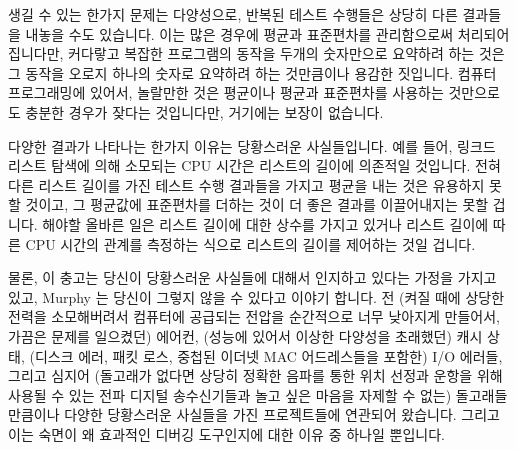 생길 수 있는 한가지 문제는 다양성으로, 반복된 테스트 수행들은 상당히 다른
결과들을 내놓을 수도 있습니다.
이는 많은 경우에 평균과 표준편차를 관리함으로써 처리되어집니다만, 커다랗고
복잡한 프로그램의 동작을 두개의 숫자만으로 요약하려 하는 것은 그 동작을 오로지
하나의 숫자로 요약하려 하는 것만큼이나 용감한 짓입니다.
컴퓨터 프로그래밍에 있어서, 놀랄만한 것은 평균이나 평균과 표준편차를 사용하는
것만으로도 충분한 경우가 잦다는 것입니다만, 거기에는 보장이 없습니다.

다양한 결과가 나타나는 한가지 이유는 당황스러운 사실들입니다.
예를 들어, 링크드 리스트 탐색에 의해 소모되는 CPU 시간은 리스트의 길이에
의존적일 것입니다.
전혀 다른 리스트 길이를 가진 테스트 수행 결과들을 가지고 평균을 내는 것은
유용하지 못할 것이고, 그 평균값에 표준편차를 더하는 것이 더 좋은 결과를
이끌어내지는 못할 겁니다.
해야할 올바른 일은 리스트 길이에 대한 상수를 가지고 있거나 리스트 길이에 따른
CPU 시간의 관계를 측정하는 식으로 리스트의 길이를 제어하는 것일 겁니다.

물론, 이 충고는 당신이 당황스러운 사실들에 대해서 인지하고 있다는 가정을 가지고
있고, Murphy 는 당신이 그렇지 않을 수 있다고 이야기 합니다.
전 (켜질 때에 상당한 전력을 소모해버려서 컴퓨터에 공급되는 전압을 순간적으로
너무 낮아지게 만들어서, 가끔은 문제를 일으켰던) 에어컨, (성능에 있어서 이상한
다양성을 초래했던) 캐시 상태, (디스크 에러, 패킷 로스, 중첩된 이더넷 MAC
어드레스들을 포함한) I/O 에러들, 그리고 심지어 (돌고래가 없다면 상당히 정확한
음파를 통한 위치 선정과 운항을 위해 사용될 수 있는 전파 디지털 송수신기들과
놀고 싶은 마음을 자제할 수 없는) 돌고래들만큼이나 다양한 당황스러운 사실들을
가진 프로젝트들에 연관되어 왔습니다.
그리고 이는 숙면이 왜 효과적인 디버깅 도구인지에 대한 이유 중 하나일 뿐입니다.
\iffalse

